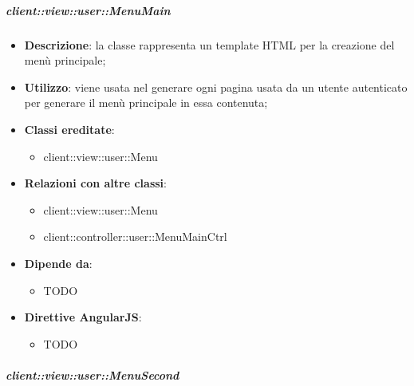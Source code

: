 		\subparagraph{client::view::user::MenuMain} %
		\label{subp:bdsm_app_client_view_user_menumain}

			\begin{itemize}
				\item \textbf{Descrizione}: la classe rappresenta un template HTML per la creazione del menù principale;
				\item \textbf{Utilizzo}: viene usata nel generare ogni pagina usata da un utente autenticato per generare il menù principale in essa contenuta;
				\item \textbf{Classi ereditate}:
					\begin{itemize}
						\item client::view::user::Menu
					\end{itemize}
				\item \textbf{Relazioni con altre classi}:
					\begin{itemize}
						\item client::view::user::Menu
						\item client::controller::user::MenuMainCtrl
					\end{itemize}
				\item \textbf{Dipende da}:
					\begin{itemize}
						\item TODO
					\end{itemize}
				\item \textbf{Direttive AngularJS}:
					\begin{itemize}
						\item TODO
					\end{itemize}
			\end{itemize}

		\subparagraph{client::view::user::MenuSecond} %
		\label{subp:bdsm_app_client_view_user_menusecond}

